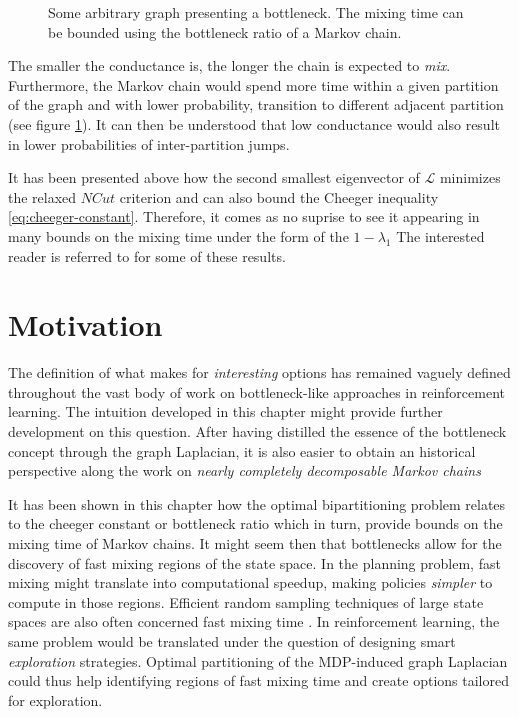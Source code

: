 \documentclass[12pt, oneside, extrafontsizes]{memoir}  %
\def\laplacian{\mathbf{\mathcal{L}}}
\newcommand{\termidx}[1]{\index{#1}{\textbf{#1}}}
\theoremstyle{plain}
\theoremstyle{definition}
\begin{document}
\begin{figure}
\centering 

\caption{Some arbitrary graph presenting a bottleneck. The mixing time can be bounded using the bottleneck ratio of a Markov chain.}
\label{fig:bottleneck}
\end{figure}

The smaller the conductance is, the longer the chain is expected to \textit{mix}.
Furthermore, the Markov chain would spend more time within a given partition of the
graph and with lower probability, transition to different adjacent partition (see figure \ref{fig:bottleneck}). It can then be
understood that low conductance would also result in lower probabilities of inter-partition
jumps.

It has been presented above how the second smallest eigenvector of $\laplacian$
minimizes the relaxed $NCut$ criterion and can also bound the Cheeger inequality
\ref{eq:cheeger-constant}. Therefore, it comes as no suprise to see it appearing in many
bounds on the mixing time under the form of the \termidx{spectral gap} $1 - \lambda_1$ The interested reader is referred to \cite{Jerrum1988, Lovasz1996,
Levin2008} for some of these results. 
 
\section{Motivation}
\label{sec:ndmc}
The definition of what makes for \textit{interesting} options has remained vaguely
defined throughout the vast body of work on bottleneck-like approaches in
reinforcement learning. The intuition developed in this chapter might provide further
development on this question. After having distilled the essence of the bottleneck
concept through the graph Laplacian, it is also easier to obtain an historical perspective
along the work on \textit{nearly completely decomposable Markov chains}

It has been shown in this chapter how the optimal bipartitioning problem relates to the
cheeger constant or bottleneck ratio which in turn, provide bounds on the mixing time
of Markov chains. It might seem then that bottlenecks allow for the discovery of fast
mixing regions of the state space. In the planning problem, fast mixing might translate
into computational speedup, making policies \textit{simpler} to compute in those
regions. Efficient random sampling techniques of large state spaces are also often
concerned fast mixing time \cite{Boyd2004}. In reinforcement learning, the same
problem would be translated under the question of designing smart \textit{exploration}
strategies. Optimal partitioning of the MDP-induced graph Laplacian could thus help
identifying regions of fast mixing time and create options tailored for exploration.
\end{document}
